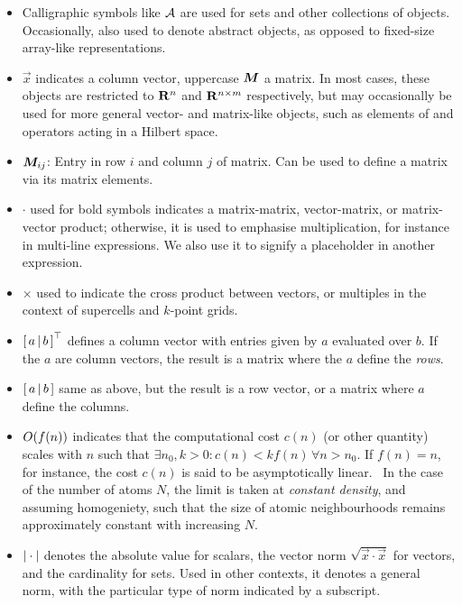 \begin{itemize}
	\item Calligraphic symbols like $\mathcal{A}$ are used for sets and other collections of objects. Occasionally, also used to denote abstract objects, as opposed to fixed-size array-like representations.
	\item $\vec{x}$ indicates a column vector, uppercase $\boldsymbol{M}$ a matrix. In most cases, these objects are restricted to ${\bf R}^n$ and ${\bf R}^{n \times m}$ respectively, but may occasionally be used for more general vector- and matrix-like objects, such as elements of and operators acting in a Hilbert space.
	\item $\boldsymbol{M}_{ij}$: Entry in row $i$ and column $j$ of matrix. Can be used to define a matrix via its matrix elements.
	\item $\cdot$ used for bold symbols indicates a matrix-matrix, vector-matrix, or matrix-vector product; otherwise, it is used to emphasise multiplication, for instance in multi-line expressions. We also use it to signify a placeholder in another expression.
	\item $\times$ used to indicate the cross product between vectors, or multiples in the context of supercells and $k$-point grids.
	\item $\left[\, a\, |\, b \, \right]^\top$ defines a column vector with entries given by $a$ evaluated over $b$. If the $a$ are column vectors, the result is a matrix where the $a$ define the \emph{rows}.
	\item $\left[\, a\, |\, b \, \right]$ same as above, but the result is a row vector, or a matrix where $a$ define the columns.
	\item $O(f(n))$ indicates that the computational cost $c(n)$ (or other quantity) scales with $n$ such that $\exists n_0, k > 0 : c(n) < k f(n) \, \forall n>n_0$. If $f(n)=n$, for instance, the cost $c(n)$ is said to be asymptotically linear.~\cite{sipser2013} In the case of the number of atoms $N$, the limit is taken at \emph{constant density}, and assuming homogeniety, such that the size of atomic neighbourhoods remains approximately constant with increasing $N$.
	\item $|\cdot|$ denotes the absolute value for scalars, the vector norm $\sqrt{\vec{x} \cdot \vec{x}}$ for vectors, and the cardinality for sets. Used in other contexts, it denotes a general norm, with the particular type of norm indicated by a subscript.
\end{itemize}

